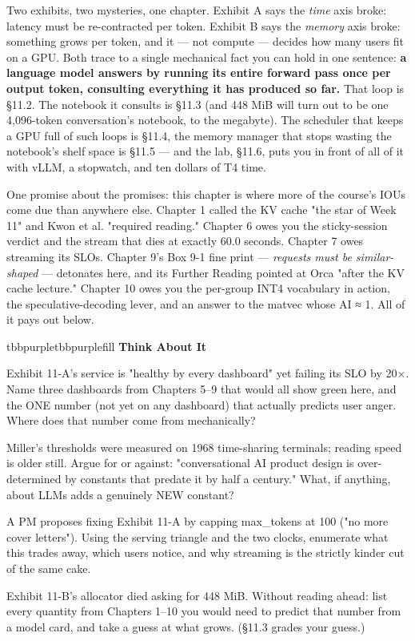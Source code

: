 Two exhibits, two mysteries, one chapter. Exhibit A says the \textit{time} axis broke: latency must be re-contracted per token. Exhibit B says the \textit{memory} axis broke: something grows per token, and it — not compute — decides how many users fit on a GPU. Both trace to a single mechanical fact you can hold in one sentence: \textbf{a language model answers by running its entire forward pass once per output token, consulting everything it has produced so far.} That loop is §11.2. The notebook it consults is §11.3 (and 448 MiB will turn out to be one 4,096-token conversation's notebook, to the megabyte). The scheduler that keeps a GPU full of such loops is §11.4, the memory manager that stops wasting the notebook's shelf space is §11.5 — and the lab, §11.6, puts you in front of all of it with vLLM, a stopwatch, and ten dollars of T4 time.

One promise about the promises: this chapter is where more of the course's IOUs come due than anywhere else. Chapter 1 called the KV cache "the star of Week 11" and Kwon et al. "required reading." Chapter 6 owes you the sticky-session verdict and the stream that dies at exactly 60.0 seconds. Chapter 7 owes streaming its SLOs. Chapter 9's Box 9-1 fine print — \textit{requests must be similar-shaped} — detonates here, and its Further Reading pointed at Orca "after the KV cache lecture." Chapter 10 owes you the per-group INT4 vocabulary in action, the speculative-decoding lever, and an answer to the matvec whose AI ≈ 1. All of it pays out below.

\begin{calloutbox}{tbbpurple}{tbbpurplefill}
{\normalsize\bfseries\color{tbbpurple}Think About It}\par\vspace{3pt}
\begin{tbbitemize}
  \item Exhibit 11-A's service is "healthy by every dashboard" yet failing its SLO by 20×. Name three dashboards from Chapters 5–9 that would all show green here, and the ONE number (not yet on any dashboard) that actually predicts user anger. Where does that number come from mechanically?
  \item Miller's thresholds were measured on 1968 time-sharing terminals; reading speed is older still. Argue for or against: "conversational AI product design is over-determined by constants that predate it by half a century." What, if anything, about LLMs adds a genuinely NEW constant?
  \item A PM proposes fixing Exhibit 11-A by capping max\_tokens at 100 ("no more cover letters"). Using the serving triangle and the two clocks, enumerate what this trades away, which users notice, and why streaming is the strictly kinder cut of the same cake.
  \item Exhibit 11-B's allocator died asking for 448 MiB. Without reading ahead: list every quantity from Chapters 1–10 you would need to predict that number from a model card, and take a guess at what grows. (§11.3 grades your guess.)
\end{tbbitemize}
\end{calloutbox}

